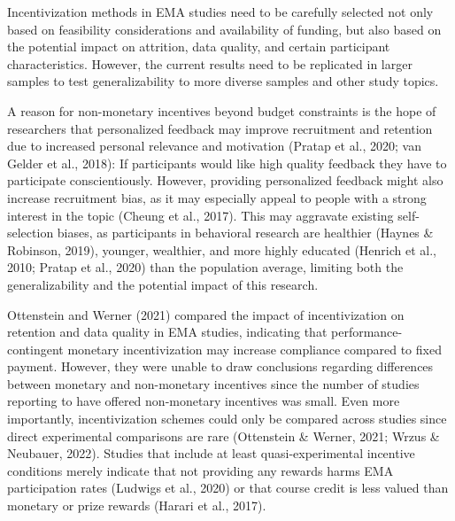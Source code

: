 \documentclass[authordate, empirical,issue]{jote-new-article}
\begin{document}
\begin{takeHomeMessage}
  Incentivization methods in EMA studies need to be carefully selected not only based on feasibility considerations and availability of funding, but also based on the potential impact on attrition, data quality, and certain participant characteristics. However, the current results need to be replicated in larger samples to test generalizability to more diverse samples and other study topics.

\end{takeHomeMessage}

A reason for non-monetary incentives beyond budget constraints is the hope of researchers that personalized feedback may improve recruitment and retention due to increased personal relevance and motivation (Pratap et al., 2020; van Gelder et al., 2018): If participants would like high quality feedback they have to participate conscientiously. However, providing personalized feedback might also increase recruitment bias, as it may especially appeal to people with a strong interest in the topic (Cheung et al., 2017). This may aggravate existing self-selection biases, as participants in behavioral research are healthier (Haynes \& Robinson, 2019), younger, wealthier, and more highly educated (Henrich et al., 2010; Pratap et al., 2020) than the population average, limiting both the generalizability and the potential impact of this research.



Ottenstein and Werner (2021) compared the impact of incentivization on retention and data quality in EMA studies, indicating that performance-contingent monetary incentivization may increase compliance compared to fixed payment. However, they were unable to draw conclusions regarding differences between monetary and non-monetary incentives since the number of studies reporting to have offered non-monetary incentives was small. Even more importantly, incentivization schemes could only be compared across studies since direct experimental comparisons are rare (Ottenstein \& Werner, 2021; Wrzus \& Neubauer, 2022). Studies that include at least quasi-experimental incentive conditions merely indicate that not providing any rewards harms EMA participation rates (Ludwigs et al., 2020) or that course credit is less valued than monetary or prize rewards (Harari et al., 2017).
\end{document}
